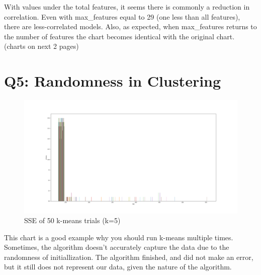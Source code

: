 \documentclass{article}
\begin{document}
        \qquad With values under the total features, it seems there is commonly a reduction in correlation. Even with max\_features equal to 29 (one less than all features), there are less-correlated models. 
        Also, as expected, when max\_features returns to the number of features the chart becomes identical with the original chart. (charts on next 2 pages)
        \clearpage
        

    \section*{Q5: Randomness in Clustering}
        \begin{figure}[h]
            \centering
            \includegraphics[width=\textwidth]{"Q5_randomness.png"}
            \caption{SSE of 50 k-means trials (k=5)}
        \end{figure}        
        \qquad This chart is a good example why you should run k-means multiple times. Sometimes, the algorithm doesn't accurately capture the data due to the randomness of initiallization.
        The algorithm finished, and did not make an error, but it still does not represent our data, given the nature of the algorithm.

        \clearpage
\end{document}
